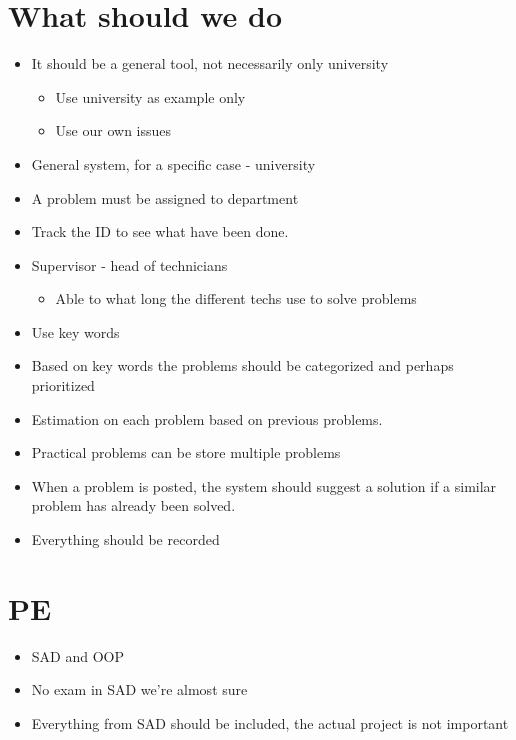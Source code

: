 \documentclass{article}
\begin{document}
\section{What should we do}

\begin{itemize}
	\item It should be a general tool, not necessarily only university
	
	\begin{itemize}
		\item Use university as example only
		\item Use our own issues
	\end{itemize}
	
	\item General system, for a specific case - university
	\item A problem must be assigned to department
	\item Track the ID to see what have been done.
	\item Supervisor - head of technicians
	
	\begin{itemize}
		\item Able to what long the different techs use to solve problems
	\end{itemize}
	
	\item Use key words
	\item Based on key words the problems should be categorized and perhaps prioritized
	\item Estimation on each problem based on previous problems.
	\item Practical problems can be store multiple problems
	\item When a problem is posted, the system should suggest a solution if a similar problem has already been solved.
	\item Everything should be recorded
	
\end{itemize}

\section{PE}

\begin{itemize}
	\item SAD and OOP
	\item No exam in SAD we're almost sure
	\item Everything from SAD should be included, the actual project is not important
\end{itemize}
\end{document}
